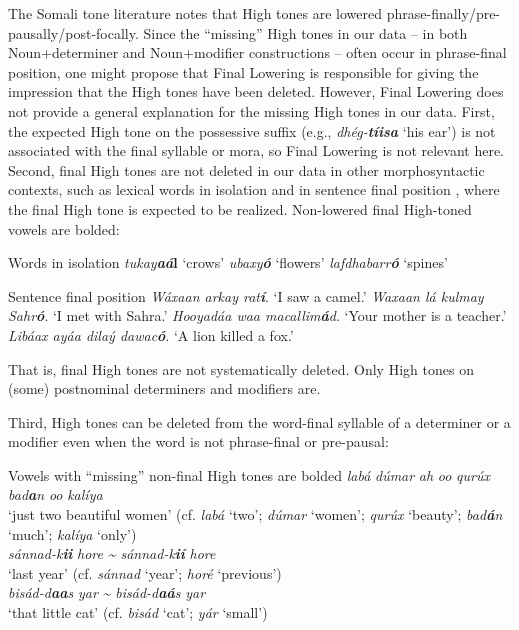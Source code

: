 \documentclass[output=paper]{langscibook}
\begin{document}
The Somali tone literature \citep{Andrzejewski1981,Armstrong1934,Hyman1981,LeGac2003,Saeed1993,Saeed1999} notes that High tones are lowered phrase-finally\slash pre-pausally\slash post-focally. Since the ``missing'' High tones in our data – in both Noun+determiner and Noun+modifier constructions – often occur in phrase-final position, one might propose that Final Lowering is responsible for giving the impression that the High tones have been deleted. However, Final Lowering does not provide a general explanation for the missing High tones in our data. First, the expected High tone on the possessive suffix (e.g., \textit{dhég-}\textbf{\textit{tíisa}} ‘his ear’) is not associated with the final syllable or mora, so Final Lowering is not relevant here. Second, final High tones are not deleted in our data in other morphosyntactic contexts, such as lexical words in isolation  and in sentence final position , where the final High tone is expected to be realized. Non-lowered final High-toned vowels are bolded:


\ea  Words in isolation  \label{ex:downing:10}
\ea  \textit{tukay}\textbf{\textit{aá}l}  ‘crows’ 
\ex   \textit{ubaxy}\textbf{\textit{ó}}  ‘flowers’ 
\ex   \textit{lafdhabarr}\textbf{\textit{ó}}  ‘spines’
\z
\z

\ea  Sentence final position \label{ex:downing:11}
\ea  \textit{Wáxaan arkay rat}\textbf{\textit{í}}.  ‘I saw a camel.’ 
\ex   \textit{Waxaan lá kulmay Sahr}\textbf{\textit{ó}}.  ‘I met with Sahra.’
\ex \textit{Hooyadáa waa macallim}\textbf{\textit{á}}\textit{d}.  ‘Your mother is a teacher.’
\ex \textit{Libáax ayáa dilaý dawac}\textbf{\textit{ó}}.  ‘A lion killed a fox.’
\z
\z

That is, final High tones are not systematically deleted. Only High tones on (some) postnominal determiners and modifiers are.

Third, High tones can be deleted from the word-final syllable of a determiner or a modifier even when the word is not phrase-final or pre-pausal:


\ea Vowels with ``missing'' non-final High tones are bolded \label{ex:downing:12}
\ea  \textit{labá} \textit{dúmar} \textit{ah} \textit{oo} \textit{qurúx} \textit{bad}\textbf{\textit{a}}\textit{n} \textit{oo} \textit{kalíya} \\
  ‘just two beautiful women’ (cf. \textit{labá} ‘two’; \textit{dúmar} ‘women’;   \textit{qurúx} ‘beauty’; \textit{bad}\textbf{\textit{á}}\textit{n} ‘much’; \textit{kalíya} ‘only’)\\
\ex   \textit{sánnad-k}\textbf{\textit{ii}} \textit{hore} \textit{{\textasciitilde} sánnad-k}\textbf{\textit{ií}} \textit{hore} \\
  ‘last year’ (cf. \textit{sánnad} ‘year’; \textit{horé} ‘previous’)\\
\ex   \textit{bisád-d}\textbf{\textit{aa}}\textit{s} \textit{yar} \textit{{\textasciitilde} bisád-d}\textbf{\textit{aá}}\textit{s} \textit{yar} \\
  ‘that little cat’ (cf. \textit{bisád} ‘cat’; \textit{yár} ‘small’)\\
\z
\z
\end{document}
